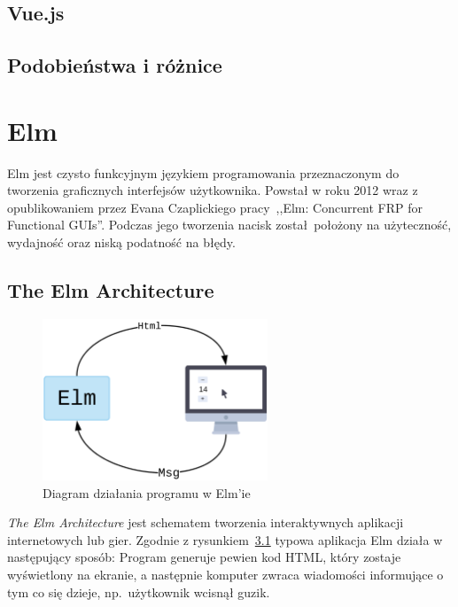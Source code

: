 \documentclass[twoside,a4paper]{report}
\begin{document}
\section{Vue.js}
\cite{vuejsdocs}
\section{Podobieństwa i różnice}


\chapter{Elm}
Elm\cite{elmdocs} jest czysto funkcyjnym językiem programowania przeznaczonym do tworzenia graficznych interfejsów użytkownika.
Powstał w roku 2012 wraz z opublikowaniem przez Evana Czaplickiego pracy~,,Elm: Concurrent FRP for Functional GUIs''\cite{Czaplicki2012ElmC}.
Podczas jego tworzenia nacisk został położony na użyteczność, wydajność oraz niską podatność na błędy.

\section{The Elm Architecture}
\begin{figure}[h]
    \centering
    \includegraphics[width=0.6\textwidth]{elm_arch.png}
    \caption{Diagram działania programu w Elm'ie}\label{fig:elm_arch}
\end{figure}

\textit{The Elm Architecture} jest schematem tworzenia interaktywnych aplikacji internetowych lub gier.
Zgodnie z rysunkiem~\ref{fig:elm_arch} typowa aplikacja Elm działa w następujący sposób: Program generuje pewien kod HTML, który zostaje wyświetlony na ekranie, a następnie komputer zwraca wiadomości informujące o tym co się dzieje, np.~użytkownik wcisnął guzik.
\end{document}
